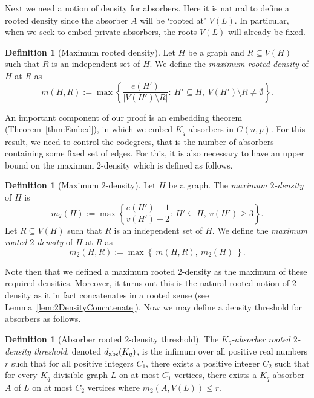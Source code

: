 \documentclass[11pt]{article}
\numberwithin{equation}{section}
\newcounter{i}
\theoremstyle{plain}
\theoremstyle{plain} %
\theoremstyle{definition}
\newtheorem{definition}[thm]{Definition}
\begin{document}
Next we need a notion of density for absorbers. Here it is natural to define a rooted density since the absorber $A$ will be `rooted at' $V(L)$. In particular, when we seek to embed private absorbers, the roots $V(L)$ will already be fixed. 

\begin{definition}[Maximum rooted density]\label{def:MaxRootedDensity}
Let $H$ be a graph and $R\subseteq V(H)$ such that $R$ is an independent set of $H$. We define the \emph{maximum rooted density} of $H$ at $R$ as
$$m(H,R):= \max\left\{ \frac{e(H')}{|V(H')\setminus R|}:~H' \subseteq H,~V(H')\setminus R \ne \emptyset\right\}.$$
\end{definition}

An important component of our proof is an embedding theorem (Theorem~\ref{thm:Embed}), in which we embed $K_q$-absorbers in $G(n,p)$.  For this result, we need to control the codegrees, that is the number of absorbers containing some fixed set of edges. For this, it is also necessary to have an upper bound on the maximum $2$-density which is defined as follows.

\begin{definition}[Maximum $2$-density]
 Let $H$ be a graph. The \emph{maximum $2$-density} of $H$ is
 $$m_2(H):= \max \left\{\frac{e(H')-1}{v(H')-2}:~H'\subseteq H,~v(H')\ge 3\right\}.$$
 Let $R\subseteq V(H)$ such that $R$ is an independent set of $H$. 
We define the \emph{maximum rooted $2$-density} of $H$ at $R$ as
$$m_2(H,R):= \max\left\{~m(H,R),~m_2(H)~\right\}.$$
\end{definition}

Note then that we defined a maximum rooted $2$-density as the maximum of these required densities. Moreover, it turns out this is the natural rooted notion of $2$-density as it in fact concatenates in a rooted sense (see Lemma~\ref{lem:2DensityConcatenate}). Now we may define a density threshold for absorbers as follows.

\begin{definition}[Absorber rooted $2$-density threshold]
The \emph{$K_q$-absorber rooted $2$-density threshold}, denoted $d_{{\rm abs}}(K_q)$, is the infimum over all positive real numbers $r$ such that for all positive integers $C_1$, there exists a positive integer $C_2$ such that for every $K_q$-divisible graph $L$ on at most $C_1$ vertices, there exists a $K_q$-absorber $A$ of $L$ on at most $C_2$ vertices where $m_2(A,V(L)) \le r$.  
\end{definition}
\end{document}
